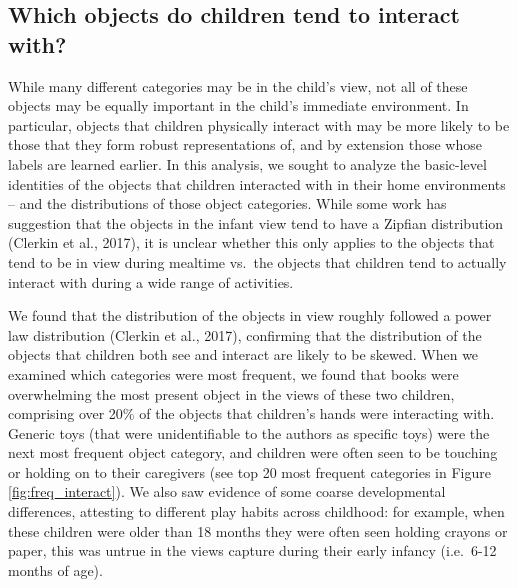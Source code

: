 \documentclass[10pt, letterpaper]{article}
\begin{document}
\hypertarget{which-objects-do-children-tend-to-interact-with}{%
\subsection{Which objects do children tend to interact
with?}\label{which-objects-do-children-tend-to-interact-with}}

While many different categories may be in the child's view, not all of
these objects may be equally important in the child's immediate
environment. In particular, objects that children physically interact
with may be more likely to be those that they form robust
representations of, and by extension those whose labels are learned
earlier. In this analysis, we sought to analyze the basic-level
identities of the objects that children interacted with in their home
environments -- and the distributions of those object categories. While
some work has suggestion that the objects in the infant view tend to
have a Zipfian distribution (Clerkin et al., 2017), it is unclear
whether this only applies to the objects that tend to be in view during
mealtime vs.~the objects that children tend to actually interact with
during a wide range of activities.

We found that the distribution of the objects in view roughly followed a
power law distribution (Clerkin et al., 2017), confirming that the
distribution of the objects that children both see and interact are
likely to be skewed. When we examined which categories were most
frequent, we found that books were overwhelming the most present object
in the views of these two children, comprising over 20\% of the objects
that children's hands were interacting with. Generic toys (that were
unidentifiable to the authors as specific toys) were the next most
frequent object category, and children were often seen to be touching or
holding on to their caregivers (see top 20 most frequent categories in
Figure \ref{fig:freq_interact}). We also saw evidence of some coarse
developmental differences, attesting to different play habits across
childhood: for example, when these children were older than 18 months
they were often seen holding crayons or paper, this was untrue in the
views capture during their early infancy (i.e.~6-12 months of age).
\end{document}
